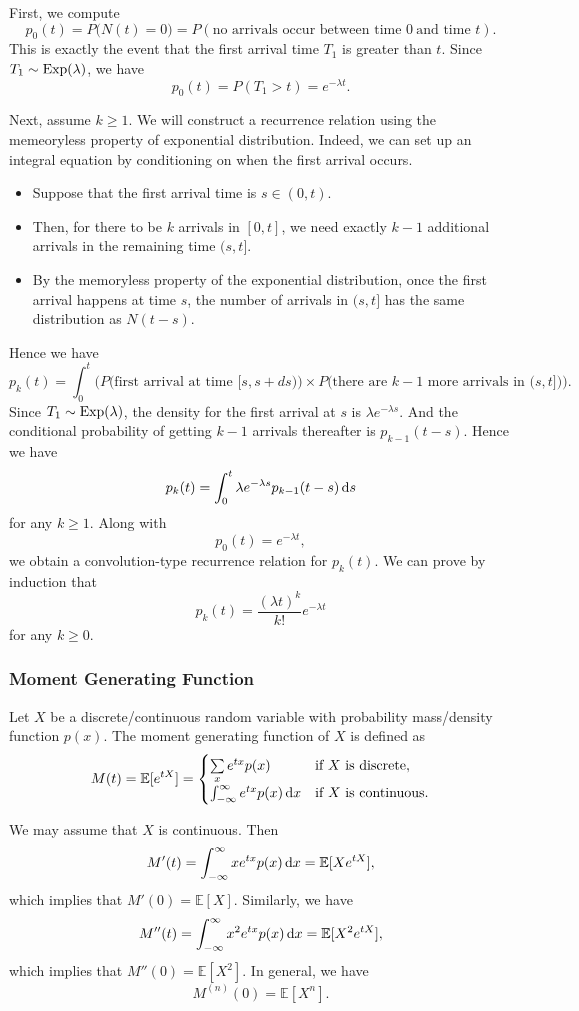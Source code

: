 \documentclass[12pt,letterpaper, onecolumn]{exam}
\begin{document}
First, we compute 
$$p_0(t)=P\big(N(t)=0\big)=P(\text{no arrivals occur between time }0\ \mbox{and time }t).$$
This is exactly the event that the first arrival time $T_1$ is greater than $t$. Since $T_1\sim{\rm{Exp}}(\lambda)$, we have 
$$p_0(t)=P(T_1>t)=e^{-\lambda t}.$$

Next, assume $k\ge 1$. We will construct a recurrence relation using the memeoryless property of exponential distribution. Indeed, we can set up an integral equation by conditioning on when the first arrival occurs.
\begin{itemize}
\item Suppose that the first arrival time is $s\in(0,t)$. 
\item Then, for there to be $k$ arrivals in $[0,t]$, we need exactly $k-1$ additional arrivals in the remaining time $(s,t]$.
\item By the memoryless property of the exponential distribution, once the first arrival happens at time $s$, the number of arrivals in $(s,t]$ has the same distribution as $N(t-s)$.
\end{itemize} 
Hence we have 
$$p_k(t)=\int_0^t\Big(P\big(\text{first arrival at time $[s,s+ds)$}\big)\times P\big(\text{there are $k-1$ more arrivals in $(s,t]$}\big)\Big).$$
Since $T_1\sim{\rm{Exp}}(\lambda)$, the density for the first arrival at $s$ is $\lambda e^{-\lambda s}$. And the conditional probability of getting $k-1$ arrivals thereafter is $p_{k-1}(t-s)$. Hence we have 
$$p_k(t)=\int_0^t\lambda e^{-\lambda s}p_{k-1}(t-s)\,{\rm{d}}s$$
for any $k\ge 1$. Along with 
$$p_0(t)=e^{-\lambda t},$$
we obtain a convolution-type recurrence relation for $p_k(t)$. We can prove by induction that
$$p_k(t)=\frac{(\lambda t)^k}{k!}e^{-\lambda t}$$
for any $k\ge 0$.

\subsubsection{Moment Generating Function}
\indent\quad Let $X$ be a discrete/continuous random variable with probability mass/density function $p(x)$. The moment generating function of $X$ is defined as
$$M(t)=\mathbb{E}[e^{tX}]=\begin{cases}
    \sum\limits_x e^{tx}p(x)&\text{if $X$ is discrete},\\
    \int_{-\infty}^{\infty}e^{tx}p(x)\,{\rm{d}}x&\text{if $X$ is continuous}.
\end{cases}$$

We may assume that $X$ is continuous. Then 
$$M'(t)=\int_{-\infty}^{\infty}xe^{tx}p(x)\,{\rm{d}}x=\mathbb{E}[Xe^{tX}],$$
which implies that $M'(0)=\mathbb{E}[X]$. Similarly, we have 
$$M''(t)=\int_{-\infty}^{\infty}x^2e^{tx}p(x)\,{\rm{d}}x=\mathbb{E}[X^2e^{tX}],$$
which implies that $M''(0)=\mathbb{E}[X^2]$. In general, we have
$$M^{(n)}(0)=\mathbb{E}[X^n].$$
\end{document}
